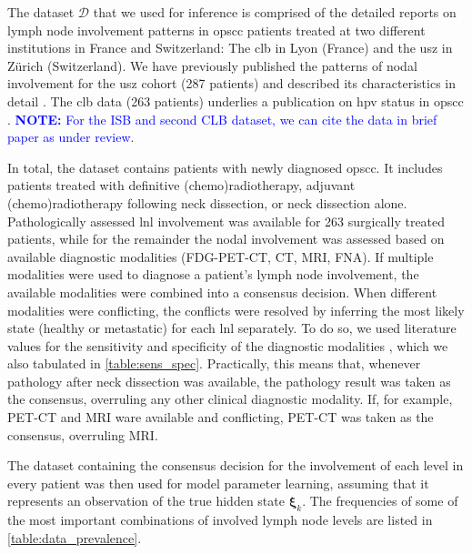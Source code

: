\documentclass[twocolumn]{aastex631}
\newcommand{\rl}[1]{{\textcolor{blue}{#1}}}
\begin{document}
The dataset $\boldsymbol{\mathcal{D}}$ that we used for inference is comprised of the detailed reports on lymph node involvement patterns in \gls{opscc} patients treated at two different institutions in France and Switzerland: The \gls{clb} in Lyon (France) and the \gls{usz} in Zürich (Switzerland). We have previously published the patterns of nodal involvement for the \gls{usz} cohort (287 patients) \cite{ludwig_dataset_2022} and described its characteristics in detail \cite{ludwig_detailed_2022}. The \gls{clb} data (263 patients) underlies a publication on \gls{hpv} status in \gls{opscc} \cite{bauwens_prevalence_2021}. \rl{\textbf{NOTE:} For the ISB and second CLB dataset, we can cite the data in brief paper as under review}.

In total, the dataset contains  patients with newly diagnosed \gls{opscc}. It includes patients treated with definitive (chemo)radiotherapy, adjuvant (chemo)radiotherapy following neck dissection, or neck dissection alone. Pathologically assessed \gls{lnl} involvement was available for 263 surgically treated patients, while for the remainder the nodal involvement was assessed based on available diagnostic modalities (FDG-PET-CT, CT, MRI, FNA). If multiple modalities were used to diagnose a patient's lymph node involvement, the available modalities were combined into a consensus decision. When different modalities were conflicting, the conflicts were resolved by inferring the most likely state (healthy or metastatic) for each \gls{lnl} separately. To do so, we used literature values for the sensitivity and specificity of the diagnostic modalities \cite{de_bondt_detection_2007,kyzas_18f-fluorodeoxyglucose_2008}, which we also tabulated in \cref{table:sens_spec}. Practically, this means that, whenever pathology after neck dissection was available, the pathology result was taken as the consensus, overruling any other clinical diagnostic modality. If, for example, PET-CT and MRI ware available and conflicting, PET-CT was taken as the consensus, overruling MRI.

The dataset containing the consensus decision for the involvement of each level in every patient was then used for model parameter learning, assuming that it represents an observation of the true hidden state $\boldsymbol{\xi}_k$. The frequencies of some of the most important combinations of involved lymph node levels are listed in \cref{table:data_prevalence}.
\end{document}
